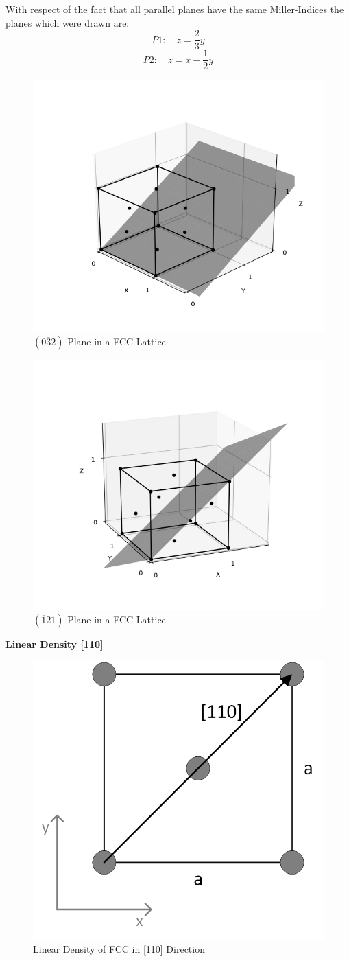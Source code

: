 With respect of the fact that all parallel planes have the same Miller-Indices the planes which were drawn are:
$$P1: \quad z = \frac{2}{3}y$$
$$P2: \quad z = x -\frac{1}{2}y$$

\begin{figure}[H]
	\centering
	\includegraphics[width=0.6\linewidth]{Graphics/Chapter1/PLANE032}
	\caption{$(0\overline{3}2)$-Plane in a FCC-Lattice}
	\label{}
\end{figure}


\begin{figure}[H]
	\centering
	\includegraphics[width=0.6\linewidth]{Graphics/Chapter1/PLANE121}
	\caption{$(\overline{1}21)$-Plane in a FCC-Lattice}
	\label{}
\end{figure}


\textbf{Linear Density [110]}

\begin{figure}[H]
	\centering
	\includegraphics[width=0.5\linewidth]{Graphics/Chapter1/Lin_Den}
	\caption{Linear Density of FCC in [110] Direction}
	\label{}
\end{figure}


